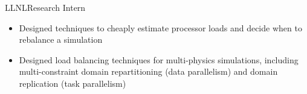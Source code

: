 		{LLNL}{Research Intern}{}{}
		{\begin{itemize}
			\item Designed techniques to cheaply estimate processor loads and decide
				when to rebalance a simulation
			\item Designed load balancing techniques for multi-physics simulations,
				including multi-constraint domain repartitioning (data parallelism)
				and domain replication (task parallelism)
		\end{itemize}}

